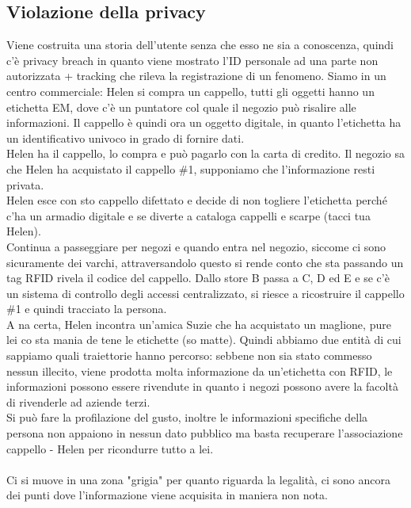 \documentclass[oneside, 12pt]{extbook}
\begin{document}
\subsection{Violazione della privacy}
Viene costruita una storia dell'utente senza che esso ne sia a conoscenza, quindi c'è privacy breach in quanto viene mostrato l'ID personale ad una parte non autorizzata + tracking che rileva la registrazione di un fenomeno. Siamo in un centro commerciale: Helen si compra un cappello, tutti gli oggetti hanno un etichetta EM, dove c'è un puntatore col quale il negozio può risalire alle informazioni. Il cappello è quindi ora un oggetto digitale, in quanto l'etichetta ha un identificativo univoco in grado di fornire dati.\\Helen ha il cappello, lo compra e può pagarlo con la carta di credito. Il negozio sa che Helen ha acquistato il cappello \#1, supponiamo che l'informazione resti privata.\\Helen esce con sto cappello difettato e decide di non togliere l'etichetta perché c'ha un armadio digitale e se diverte a cataloga cappelli e scarpe (tacci tua Helen).\\Continua a passeggiare per negozi e quando entra nel negozio, siccome ci sono sicuramente dei varchi, attraversandolo questo si rende conto che sta passando un tag RFID rivela il codice del cappello. Dallo store B passa a C, D ed E e se c'è un sistema di controllo degli accessi centralizzato, si riesce a ricostruire il cappello \#1 e quindi tracciato la persona.\\A na certa, Helen incontra un'amica Suzie che ha acquistato un maglione, pure lei co sta mania de tene le etichette (so matte). Quindi abbiamo due entità di cui sappiamo quali traiettorie hanno percorso: sebbene non sia stato commesso nessun illecito, viene prodotta molta informazione da un'etichetta con RFID, le informazioni possono essere rivendute in quanto i negozi possono avere la facoltà di rivenderle ad aziende terzi.\\Si può fare la profilazione del gusto, inoltre le informazioni specifiche della persona non appaiono in nessun dato pubblico ma basta recuperare l'associazione cappello - Helen per ricondurre tutto a lei.\\\\Ci si muove in una zona "grigia" per quanto riguarda la legalità, ci sono ancora dei punti dove l'informazione viene acquisita in maniera non nota.
\end{document}
